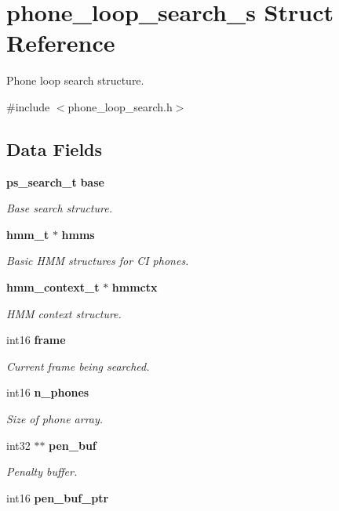 \section{phone\+\_\+loop\+\_\+search\+\_\+s Struct Reference}
\label{structphone__loop__search__s}


Phone loop search structure.  




{\ttfamily \#include $<$phone\+\_\+loop\+\_\+search.\+h$>$}

\subsection*{Data Fields}
\begin{DoxyCompactItemize}
\item 
{\bf ps\+\_\+search\+\_\+t} {\bf base}
\begin{DoxyCompactList}\small\item\em Base search structure. \end{DoxyCompactList}\item 
{\bf hmm\+\_\+t} $\ast$ {\bf hmms}
\begin{DoxyCompactList}\small\item\em Basic H\+M\+M structures for C\+I phones. \end{DoxyCompactList}\item 
{\bf hmm\+\_\+context\+\_\+t} $\ast$ {\bf hmmctx}
\begin{DoxyCompactList}\small\item\em H\+M\+M context structure. \end{DoxyCompactList}\item 
int16 {\bf frame}
\begin{DoxyCompactList}\small\item\em Current frame being searched. \end{DoxyCompactList}\item 
int16 {\bf n\+\_\+phones}
\begin{DoxyCompactList}\small\item\em Size of phone array. \end{DoxyCompactList}\item 
int32 $\ast$$\ast$ {\bf pen\+\_\+buf}\label{structphone__loop__search__s_ad9233a565738a5097097bab89193e2c5}

\begin{DoxyCompactList}\small\item\em Penalty buffer. \end{DoxyCompactList}\item 
int16 {\bf pen\+\_\+buf\+\_\+ptr}\label{structphone__loop__search__s_a630510d46979533e7acfd1e70d80ea97}


\end{DoxyCompactItemize}
